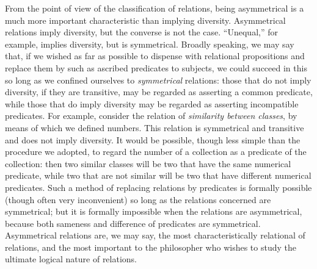 {From the point of view of the classification of
relations,
being
asymmetrical is a much more important characteristic than implying
diversity. Asymmetrical relations imply diversity, but the converse is
not the case. ``Unequal,'' for example, implies diversity, but is
symmetrical. Broadly speaking, we may say that, if we wished as far as
possible to dispense with relational propositions and replace them by
such as ascribed predicates to subjects, we could succeed in this so
long as we confined ourselves to \textit{symmetrical}
relations: those that do
not imply diversity, if they are transitive, may be regarded as
asserting a common predicate, while those that do imply diversity may
be
regarded as asserting incompatible predicates. For example, consider
the relation of \textit{similarity
between classes}, by means of which we
defined numbers. This relation is symmetrical and transitive and does
not imply diversity. It would be possible, though less simple than the
procedure we adopted, to regard the number of a collection as a
predicate of the collection: then two similar classes will be two that
have the same numerical predicate, while two that are not similar will
be two that have different numerical predicates. Such a method of
replacing relations by predicates is formally possible (though often
very inconvenient) so long as the relations concerned are symmetrical;
but it is formally impossible when the relations are asymmetrical,
because both sameness and difference of predicates are symmetrical.
Asymmetrical relations are, we may   say, the most characteristically
relational of relations, and the most important to the philosopher who
wishes to study the ultimate logical nature of relations.

}
